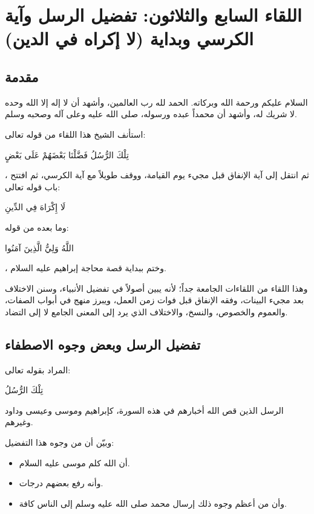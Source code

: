 \chapter{اللقاء السابع والثلاثون: تفضيل الرسل وآية الكرسي وبداية (لا إكراه في الدين)}

\section{مقدمة}
السلام عليكم ورحمة الله وبركاته. الحمد لله رب العالمين، وأشهد أن لا إله إلا الله وحده لا شريك له، وأشهد أن محمداً عبده ورسوله، صلى الله عليه وعلى آله وصحبه وسلم.

استأنف الشيخ هذا اللقاء من قوله تعالى: \begin{ayah}تِلْكَ الرُّسُلُ فَضَّلْنَا بَعْضَهُمْ عَلَى بَعْضٍ\end{ayah}، ثم انتقل إلى آية الإنفاق قبل مجيء يوم القيامة، ووقف طويلاً مع آية الكرسي، ثم افتتح باب قوله تعالى: \begin{ayah}لَا إِكْرَاهَ فِي الدِّينِ\end{ayah} وما بعده من قوله: \begin{ayah}اللَّهُ وَلِيُّ الَّذِينَ آمَنُوا\end{ayah}، وختم ببداية قصة محاجة إبراهيم عليه السلام.

وهذا اللقاء من اللقاءات الجامعة جداً؛ لأنه يبين أصولاً في تفضيل الأنبياء، وسنن الاختلاف بعد مجيء البينات، وفقه الإنفاق قبل فوات زمن العمل، ويبرز منهج  في أبواب الصفات، والعموم والخصوص، والنسخ، والاختلاف الذي يرد إلى المعنى الجامع لا إلى التضاد.

\separator

\section{تفضيل الرسل وبعض وجوه الاصطفاء}
 المراد بقوله تعالى: \begin{ayah}تِلْكَ الرُّسُلُ\end{ayah} الرسل الذين قص الله أخبارهم في هذه السورة، كإبراهيم وموسى وعيسى وداود وغيرهم.

وبيّن  أن من وجوه هذا التفضيل:
\begin{itemize}
    \item أن الله كلم موسى عليه السلام.
    \item وأنه رفع بعضهم درجات.
    \item وأن من أعظم وجوه ذلك إرسال محمد صلى الله عليه وسلم إلى الناس كافة.
\end{itemize}

